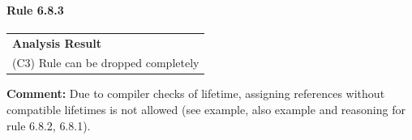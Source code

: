 \paragraph{Rule 6.8.3}
\begin{longtable}{p{13cm}}
\textbf{Analysis Result} \\
(C3) Rule can be dropped completely \\
\end{longtable}
\textbf{Comment:} Due to compiler checks of lifetime, assigning references without compatible lifetimes is not allowed (see example, also example and reasoning for rule 6.8.2, 6.8.1). \\


